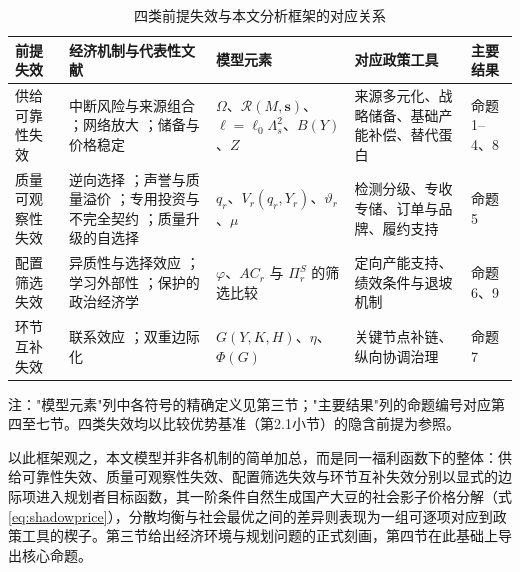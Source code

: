 \documentclass[UTF8,zihao=-4,fontset=fandol]{ctexart}
\numberwithin{equation}{section}
\theoremstyle{definition}
\theoremstyle{remark}
\begin{document}
\begin{table}[H]
\centering
\caption{四类前提失效与本文分析框架的对应关系}
\label{tab:framework}
\begin{threeparttable}
\footnotesize
\begin{tabularx}{\textwidth}{p{}Xp{}p{}p{}}
\toprule
前提失效 & 经济机制与代表性文献 & 模型元素 & 对应政策工具 & 主要结果\\
\midrule
供给可靠性失效 & 中断风险与来源组合 \parencite{Markowitz1952,GrossmanHelpmanLhuillier2023}；网络放大 \parencite{AcemogluEtAl2012,BarrotSauvagnat2016}；储备与价格稳定 \parencite{NewberyStiglitz1981,WilliamsWright1991} & $\Omega$、$\mathcal{R}(M,\bm s)$、$\ell=\ell_0\Lambda_s^2$、$B(Y)$、$Z$ & 来源多元化、战略储备、基础产能补偿、替代蛋白 & 命题1--4、8\\
\addlinespace
质量可观察性失效 & 逆向选择 \parencite{Akerlof1970}；声誉与质量溢价 \parencite{KleinLeffler1981}；专用投资与不完全契约 \parencite{Williamson1979,AntrasHelpman2004}；质量升级的自选择 \parencite{Verhoogen2008,KuglerVerhoogen2012,FajgelbaumGrossmanHelpman2011} & $q_r$、$V_r(q_r,Y_r)$、$\vartheta_r$、$\mu$ & 检测分级、专收专储、订单与品牌、履约支持 & 命题5\\
\addlinespace
配置筛选失效 & 异质性与选择效应 \parencite{Melitz2003}；学习外部性 \parencite{Arrow1962,Krugman1987}；保护的政治经济学 \parencite{GrossmanHelpman1994,JuhaszLaneRodrik2024} & $\varphi$、$AC_r$ 与 $\Pi_r^{S}$ 的筛选比较 & 定向产能支持、绩效条件与退坡机制 & 命题6、9\\
\addlinespace
环节互补失效 & 联系效应 \parencite{Hirschman1958}；双重边际化 \parencite{Spengler1950} & $G(Y,K,H)$、$\eta$、$\Phi(G)$ & 关键节点补链、纵向协调治理 & 命题7\\
\bottomrule
\end{tabularx}
\begin{tablenotes}[flushleft]
\footnotesize
\item 注："模型元素"列中各符号的精确定义见第三节；"主要结果"列的命题编号对应第四至七节。四类失效均以比较优势基准（第2.1小节）的隐含前提为参照。
\end{tablenotes}
\end{threeparttable}
\end{table}

以此框架观之，本文模型并非各机制的简单加总，而是同一福利函数下的整体：供给可靠性失效、质量可观察性失效、配置筛选失效与环节互补失效分别以显式的边际项进入规划者目标函数，其一阶条件自然生成国产大豆的社会影子价格分解（式\eqref{eq:shadowprice}），分散均衡与社会最优之间的差异则表现为一组可逐项对应到政策工具的楔子。第三节给出经济环境与规划问题的正式刻画，第四节在此基础上导出核心命题。
\end{document}
